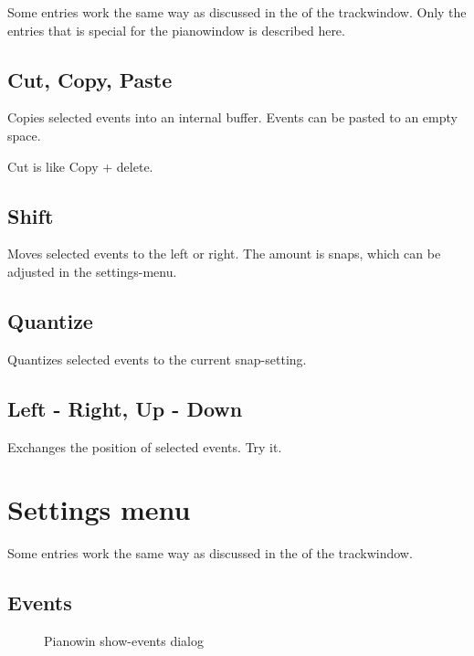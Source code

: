 \documentclass[letterpaper]{report}
\begin{document}
Some entries work the same way as discussed in the 
of the trackwindow. Only the entries that is special for the pianowindow is
described here.

\subsection{Cut, Copy, Paste}\label{pwcutpaste}
Copies selected events into an internal buffer. Events can be pasted to an
empty space.

Cut is like Copy + delete.

\subsection{Shift}\label{pwshift}

Moves selected events to the left or right. The amount is snaps, which can be
adjusted in the settings-menu.

\subsection{Quantize}
Quantizes selected events to the current snap-setting.

\subsection{Left - Right, Up - Down}

Exchanges the position of selected events. Try it.

\section{Settings menu}

Some entries work the same way as discussed in the
 of the trackwindow.

\subsection{Events}\label{pwevents}

\begin{figure}
\caption{Pianowin show-events dialog}
\end{figure}
\end{document}
